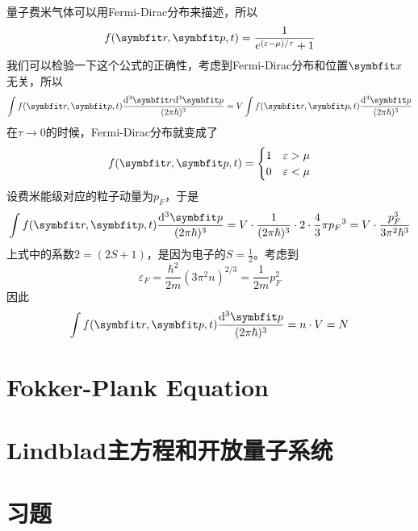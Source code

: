 \documentclass[AutoFakeBold]{tstextbook}
\begin{document}
量子费米气体可以用Fermi-Dirac分布来描述，所以\begin{equation}
    f(\bd{r},\bd{p},t)=\frac{1}{e^{(\varepsilon-\mu)/\tau}+1}
\end{equation}
我们可以检验一下这个公式的正确性，考虑到Fermi-Dirac分布和位置$\bd{x}$无关，所以\begin{equation}
    \int f(\bd{r},\bd{p},t)\frac{\di^3\bd{r}\di^3\bd{p}}{(2\pi\hbar)^3}=V\int f(\bd{r},\bd{p},t)\frac{\di^3\bd{p}}{(2\pi\hbar)^3}
\end{equation}
在$\tau\to 0$的时候，Fermi-Dirac分布就变成了\begin{equation}
    f(\bd{r},\bd{p},t)=\begin{cases}
        1 & \varepsilon>\mu \\
        0 & \varepsilon<\mu
    \end{cases}
\end{equation}
设费米能级对应的粒子动量为$p_F$，于是\begin{equation}
    \int f(\bd{r},\bd{p},t)\frac{\di^3\bd{p}}{(2\pi\hbar)^3}=V\cdot \frac{1}{(2\pi \hbar)^3}\cdot 2\cdot \frac{4}{3}\pi {p_F}^{3}=V\cdot \frac{p_F^3}{3\pi^2 \hbar^3}
\end{equation}
上式中的系数$2=(2S+1)$，是因为电子的$S=\frac{1}{2}$。考虑到\begin{equation}
    \varepsilon_F=\frac{\hbar^2}{2m} (3\pi^2 n)^{2/3}=\frac{1}{2m} p_F^2
\end{equation}
因此\begin{equation}
    \int f(\bd{r},\bd{p},t)\frac{\di^3\bd{p}}{(2\pi\hbar)^3}=n\cdot V=N
\end{equation}
\section{Fokker-Plank Equation} %
\label{sec:Fokker-Plank Equation}
\section{Lindblad主方程和开放量子系统} %
\label{sec:Lindblad主方程和开放量子系统}
\section{习题} %
\label{sec:习题15}

\end{document}
